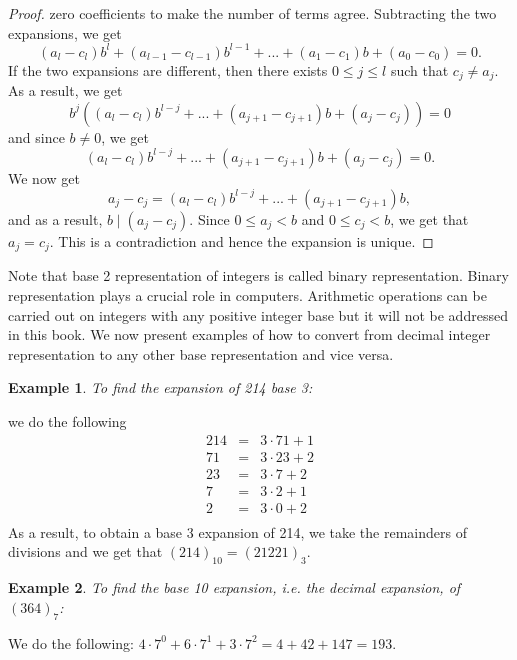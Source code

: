 \documentclass[12pt,letterpaper]{book}
\newtheorem{example}{Example}
\begin{document}
\begin{proof}
zero coefficients to make the number of terms agree.  Subtracting
the two expansions, we get
\begin{equation*}
(a_l-c_l)b^l+(a_{l-1}-c_{l-1})b^{l-1}+...+(a_1-c_1)b+(a_0-c_0)=0.
\end{equation*}
If the two expansions are different, then there exists $0\leq j\leq
l$ such that $c_j\neq a_j$.  As a result, we get
\begin{equation*}
b^j((a_l-c_l)b^{l-j}+...+(a_{j+1}-c_{j+1})b+(a_j-c_j))=0
\end{equation*}
and since $b\neq 0$, we get
\begin{equation*}
(a_l-c_l)b^{l-j}+...+(a_{j+1}-c_{j+1})b+(a_j-c_j)=0.
\end{equation*}
We now get
\begin{equation*}
 a_j-c_j=(a_l-c_l)b^{l-j}+...+(a_{j+1}-c_{j+1})b,
\end{equation*}
and as a result, $b\mid (a_j-c_j)$.  Since $0\leq a_j<b$ and $0\leq
c_j<b$, we get that $a_j=c_j$.  This is a contradiction and hence
the expansion is unique.
\end{proof}
 Note that base 2 representation of
integers is called binary representation.  Binary representation
plays a crucial role in computers.  Arithmetic operations can be
carried out on integers with any positive integer base but it will
not be addressed in this book. We now present examples of how to
convert from decimal integer representation to any other base
representation and vice versa.
\begin{example}
To find the expansion of 214 base 3:
\end{example}
we do the following
\begin{eqnarray*}
214&=&3\cdot 71+1\\
71&=& 3\cdot 23+2\\
23&=& 3\cdot 7+2\\
7&=& 3\cdot 2+1\\
2&=& 3\cdot 0+2\\
\end{eqnarray*}
As a result, to obtain a base 3 expansion of 214, we take the
remainders of divisions and we get that $(214)_{10}=(21221)_3$.


\begin{example}
To find the base 10 expansion, i.e. the decimal expansion, of $(364)_7$:
\end{example}
We do the following: $4\cdot 7^0+6\cdot 7^1+3\cdot 7^2=4+42+147=193$.
\end{document}
